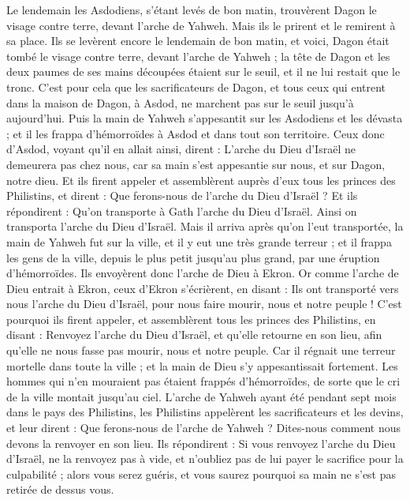 \begin{multicols}{2}
Le lendemain les Asdodiens, s'étant levés de bon matin, trouvèrent Dagon le visage contre terre, devant l'arche de Yahweh. Mais ils le prirent et le remirent à sa place.
Ils se levèrent encore le lendemain de bon matin, et voici, Dagon était tombé le visage contre terre, devant l'arche de Yahweh ; la tête de Dagon et les deux paumes de ses mains découpées étaient sur le seuil, et il ne lui restait que le tronc.
C'est pour cela que les sacrificateurs de Dagon, et tous ceux qui entrent dans la maison de Dagon, à Asdod, ne marchent pas sur le seuil jusqu'à aujourd'hui.
Puis la main de Yahweh s'appesantit sur les Asdodiens et les dévasta ; et il les frappa d'hémorroïdes à Asdod et dans tout son territoire.
Ceux donc d'Asdod, voyant qu'il en allait ainsi, dirent : L'arche du Dieu d'Israël ne demeurera pas chez nous, car sa main s'est appesantie sur nous, et sur Dagon, notre dieu.
Et ils firent appeler et assemblèrent auprès d'eux tous les princes des Philistins, et dirent : Que ferons-nous de l'arche du Dieu d'Israël ? Et ils répondirent : Qu'on transporte à Gath l'arche du Dieu d'Israël. Ainsi on transporta l'arche du Dieu d'Israël.
Mais il arriva après qu'on l'eut transportée, la main de Yahweh fut sur la ville, et il y eut une très grande terreur ; et il frappa les gens de la ville, depuis le plus petit jusqu'au plus grand, par une éruption d'hémorroïdes.
Ils envoyèrent donc l'arche de Dieu à Ekron. Or comme l'arche de Dieu entrait à Ekron, ceux d'Ekron s'écrièrent, en disant : Ils ont transporté vers nous l'arche du Dieu d'Israël, pour nous faire mourir, nous et notre peuple !
C'est pourquoi ils firent appeler, et assemblèrent tous les princes des Philistins, en disant : Renvoyez l'arche du Dieu d'Israël, et qu'elle retourne en son lieu, afin qu'elle ne nous fasse pas mourir, nous et notre peuple. Car il régnait une terreur mortelle dans toute la ville ; et la main de Dieu s'y appesantissait fortement.
Les hommes qui n'en mouraient pas étaient frappés d'hémorroïdes, de sorte que le cri de la ville montait jusqu'au ciel.
\VerseOne{}L'arche de Yahweh ayant été pendant sept mois dans le pays des Philistins,
les Philistins appelèrent les sacrificateurs et les devins, et leur dirent : Que ferons-nous de l'arche de Yahweh ? Dites-nous comment nous devons la renvoyer en son lieu.
Ils répondirent : Si vous renvoyez l'arche du Dieu d'Israël, ne la renvoyez pas à vide, et n'oubliez pas de lui payer le sacrifice pour la culpabilité ; alors vous serez guéris, et vous saurez pourquoi sa main ne s'est pas retirée de dessus vous.

\end{multicols}
